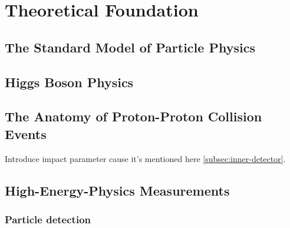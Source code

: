 \chapter{Theoretical Foundation}
\label{chap:theory}

\section{The Standard Model of Particle Physics}

\section{Higgs Boson Physics}


\section{The Anatomy of Proton-Proton Collision Events}

Introduce impact parameter cause it's mentioned here \cref{subsec:inner-detector}.


\section{High-Energy-Physics Measurements}

\subsection{Particle detection}
